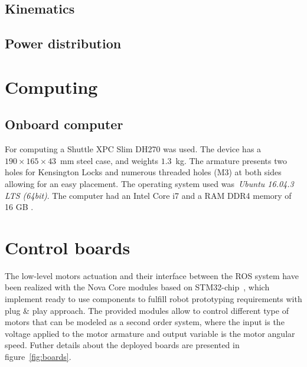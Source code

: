 \subsection{Kinematics}

\subsection{Power distribution}

\section{Computing}

\subsection{Onboard computer}\label{onboard pc}
For computing a Shuttle XPC Slim DH270 was used. The device has a $190 \times 165 \times 43$~mm steel case, and weights $1.3$~kg.  The armature presents two holes for Kensington Locks and numerous threaded holes (M3) at both sides allowing for an easy placement. The operating system used was~\textit{Ubuntu 16.04.3 LTS (64bit)}. The computer had an Intel Core i7 and a RAM DDR4 memory of 16 GB .

\section{Control boards}
\label{novacore}
The low-level motors actuation and their interface between the ROS system have been realized with the Nova Core modules based on STM32-chip~\cite{noauthor_nova_nodate}, which implement ready to use components to fulfill robot prototyping requirements with plug \& play approach.  
The provided modules allow to control different type of motors that can be modeled as a second order system, where the input is the voltage applied to the motor armature and output variable is the motor angular speed. Futher details about the deployed boards are presented in figure~\ref{fig:boards}.


